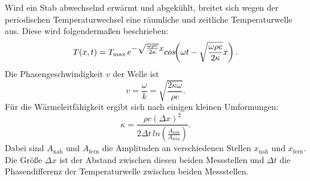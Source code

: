 \noindent Wird ein Stab abwechselnd erwärmt und abgekühlt, breitet sich wegen der periodischen Temperaturwechsel eine räumliche 
und zeitliche Temperaturwelle aus. Diese wird folgendermaßen beschrieben:
\begin{equation*}
    T(x,t) = T_\text{max} \,  e^{\mathlarger{-\sqrt{\frac{\omega \rho c}{2 \kappa}} x}} cos\!\!\left(\omega t - \sqrt{\frac{\omega \rho c}{2 \kappa}} x\right).
\end{equation*}
Die Phasengeschwindigkeit $v$ der Welle ist
\begin{equation*}
    v= \frac{\omega}{k} = \sqrt{\frac{2\kappa \omega}{\rho c}}.
\end{equation*}
Für die Wärmeleitfähigkeit ergibt sich nach einigen kleinen Umformungen: %
\begin{equation}
    \kappa = \frac{\rho c (\Delta x)^2}{2 \Delta t \, ln\!\!\left(\frac{A_\text{nah}}{A_\text{fern}}\right)}.
    \label{eqn:Wärme}
\end{equation}
Dabei sind $A_\text{nah}$ und $A_\text{fern}$ die Amplituden an verschiedenen Stellen $x_\text{nah}$ und $x_\text{fern}$. Die Größe $\Delta x$ ist 
der Abstand zwischen diesen beiden Messstellen und $\Delta t$ die Phasendifferenz der Temperaturwelle zwischen beiden 
Messstellen.
